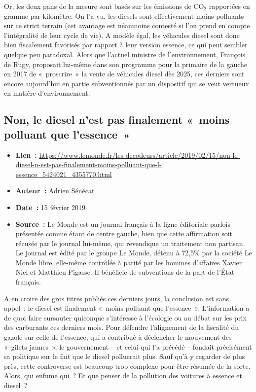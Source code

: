 \documentclass[8pt]{article}
\begin{document}
Or, les deux pans de la mesure sont basés sur les émissions de CO$_2$ rapportées en gramme par kilomètre. On l’a vu, les diesels sont effectivement moins polluants sur ce strict terrain (cet avantage est néanmoins contesté si l’on prend en compte l’intégralité de leur cycle de vie). A modèle égal, les véhicules diesel sont donc bien fiscalement favorisés par rapport à leur version essence, ce qui peut sembler quelque peu paradoxal.
Alors que l’actuel ministre de l’environnement, François de Rugy, proposait lui-même dans son programme pour la primaire de la gauche en 2017 de «~proscrire~» la vente de véhicules diesel dès 2025, ces derniers sont encore aujourd’hui en partie subventionnés par un dispositif qui se veut vertueux en matière d’environnement.

\newpage
\subsection{Non, le diesel n’est pas finalement «~moins polluant que l’essence~»}
\label{sec:lemonde_moinspolluant}
\begin{itemize}
	\item \textbf{Lien~: } \url{https://www.lemonde.fr/les-decodeurs/article/2019/02/15/non-le-diesel-n-est-pas-finalement-moins-polluant-que-l-essence_5424021_4355770.html} 
	\item \textbf{Auteur~: } Adrien Sénécat
	\item \textbf{Date~: } 15 février 2019
	\item \textbf{Source~: } Le Monde est un journal français à la ligne éditoriale parfois présentée comme étant de centre gauche, bien que cette affirmation soit récusée par le journal lui-même, qui revendique un traitement non partisan. Le journal est édité par le groupe Le Monde, détenu à 72,5\% par la société Le Monde libre, elle-même contrôlée à parité par les hommes d'affaires Xavier Niel et Matthieu Pigasse. Il bénéficie de subventions de la part de l'État français.
\end{itemize}

A en croire des gros titres publiés ces derniers jours, la conclusion est sans appel~: le diesel est finalement «~moins polluant que l’essence~». L’information a de quoi faire sursauter quiconque s’intéresse à l’écologie ou au débat sur les prix des carburants ces derniers mois. Pour défendre l’alignement de la fiscalité du gazole sur celle de l’essence, qui a contribué à déclencher le mouvement des «~gilets jaunes~», le gouvernement – et celui qui l’a précédé – fondait précisément sa politique sur le fait que le diesel polluerait plus.
Sauf qu’à y regarder de plus près, cette controverse est beaucoup trop complexe pour être résumée de la sorte. Alors, qui enfume qui~? Et que penser de la pollution des voitures à essence et diesel~?\\
\end{document}
